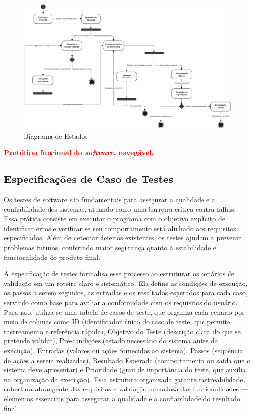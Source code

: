\begin{landscape}
\begin{figure}
    \centering
    \includegraphics[width=1\linewidth]{editaveis/figuras/diagrama_de_estados.jpg}
    \caption{Diagrama de Estados}
    \label{fig:enter-label}
\end{figure}
\end{landscape}


    \item \textcolor{red}{ \textbf{Protótipo funcional do \textit{software}, navegável.}}

\subsection{Especificações de Caso de Testes}

Os testes de software são fundamentais para assegurar a qualidade e a confiabilidade dos sistemas, atuando como uma barreira crítica contra falhas. Essa prática consiste em executar o programa com o objetivo explícito de identificar erros e verificar se seu comportamento está alinhado aos requisitos especificados. Além de detectar defeitos existentes, os testes ajudam a prevenir problemas futuros, conferindo maior segurança quanto à estabilidade e funcionalidade do produto final.

A especificação de testes formaliza esse processo ao estruturar os cenários de validação em um roteiro claro e sistemático. Ela define as condições de execução, os passos a serem seguidos, as entradas e os resultados esperados para cada caso, servindo como base para avaliar a conformidade com os requisitos do usuário. Para isso, utiliza-se uma tabela de casos de teste, que organiza cada cenário por meio de colunas como ID (identificador único do caso de teste, que permite rastreamento e referência rápida), Objetivo do Teste (descrição clara do que se pretende validar), Pré-condições (estado necessário do sistema antes da execução), Entradas (valores ou ações fornecidos ao sistema), Passos (sequência de ações a serem realizadas), Resultado Esperado (comportamento ou saída que o sistema deve apresentar) e Prioridade (grau de importância do teste, que auxilia na organização da execução). Essa estrutura organizada garante rastreabilidade, cobertura abrangente dos requisitos e validação minuciosa das funcionalidades — elementos essenciais para assegurar a qualidade e a confiabilidade do resultado final.

